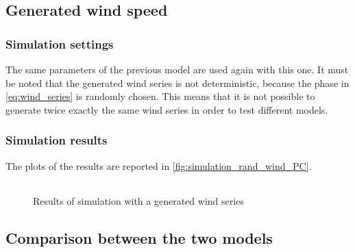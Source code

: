 \subsection{Generated wind speed}
\subsubsection{Simulation settings}
The same parameters of the previous model are used again with this one. It must be noted that the generated wind series is not deterministic, because the phase in \autoref{eq:wind_series} is randomly chosen. This means that it is not possible to generate twice exactly the same wind series in order to test different models.
\subsubsection{Simulation results}
The plots of the results are reported in \autoref{fig:simulation_rand_wind_PC}.
\begin{figure}[htb]
  \centering
  \begin{tabular}{@{}cc@{}}
  \end{tabular}
  \caption{Results of simulation with a generated wind series}
  \label{fig:simulation_rand_wind_PC}
\end{figure}

\subsection{Comparison between the two models}
